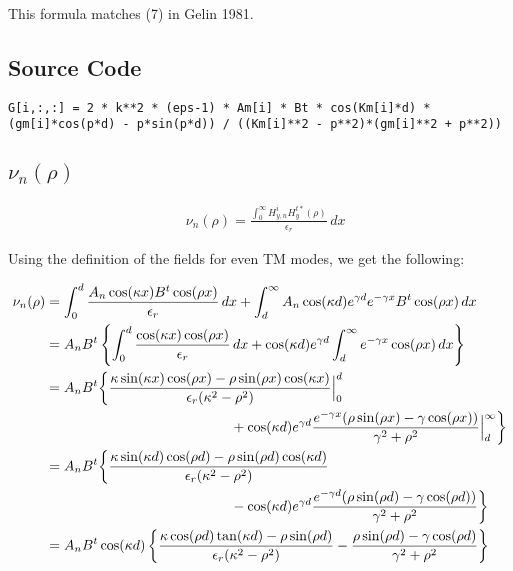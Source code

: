 \documentclass[11pt, oneside]{article}   	%
\begin{document}
\noindent This formula matches (7) in Gelin 1981.

\subsection{Source Code}

\begin{lstlisting}
G[i,:,:] = 2 * k**2 * (eps-1) * Am[i] * Bt * cos(Km[i]*d) * (gm[i]*cos(p*d) - p*sin(p*d)) / ((Km[i]**2 - p**2)*(gm[i]**2 + p**2))
\end{lstlisting}



\subsection{$\nu_{n}(\rho)$}

\begin{align*}
&\nu_{n}(\rho) = \frac{\int_{0}^{\infty} H_{y,n}^{i} H_{y}^{t*}(\rho)}{\epsilon_{r}} \, dx \nonumber
\end{align*}

\noindent Using the definition of the fields for even TM modes, we get the following:

\begin{align*}
\nu_{n}(\rho) &= \int_{0}^{d} \frac{A_{n}\cos(\kappa x) B^{t}\cos(\rho x)}{\epsilon_{r}} \, dx + \int_{d}^{\infty} A_{n}\cos(\kappa d)e^{\gamma d}e^{-\gamma x} B^{t}\cos(\rho x) \, dx \\
&= A_{n}B^{t} \left\{ \int_{0}^{d} \frac{\cos(\kappa x) \cos(\rho x)}{\epsilon_{r}} \, dx + \cos(\kappa d)e^{\gamma d} \int_{d}^{\infty} e^{-\gamma x} \cos(\rho x) \, dx \right\} \\
&= A_{n}B^{t} \bigg\{ \frac{\kappa\sin(\kappa x) \cos(\rho x) - \rho\sin(\rho x) \cos(\kappa x)}{\epsilon_{r}(\kappa^{2}-\rho^{2})} \Big|_{0}^{d}  \\
	&\hspace{132px} {} + \cos(\kappa d)e^{\gamma d} \frac{e^{-\gamma x}(\rho \sin(\rho x) - \gamma \cos(\rho x))}{\gamma^{2} + \rho^{2}} \Big|_{d}^{\infty}  \bigg\} \\
&= A_{n}B^{t} \bigg\{ \frac{\kappa\sin(\kappa d) \cos(\rho d) - \rho\sin(\rho d) \cos(\kappa d)}{\epsilon_{r}(\kappa^{2}-\rho^{2})}  \\
	&\hspace{132px} {} - \cos(\kappa d)e^{\gamma d} \frac{e^{-\gamma d}(\rho \sin(\rho d) - \gamma \cos(\rho d))}{\gamma^{2} + \rho^{2}}  \bigg\} \\
&= A_{n}B^{t} \cos(\kappa d) \left\{ \frac{\kappa \cos(\rho d) \tan(\kappa d) - \rho\sin(\rho d)}{\epsilon_{r}(\kappa^{2}-\rho^{2})} 
	- \frac{\rho \sin(\rho d) - \gamma \cos(\rho d)}{\gamma^{2} + \rho^{2}}  \right\} %
\end{align*}
\end{document}
